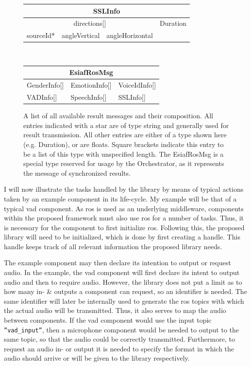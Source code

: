 \begin{figure}[]
	\begin{tabular}{| l | l | l | l|}
		\hline
		
		\multicolumn{4}{|c|}{\textbf{SSLInfo}} \\ \hline
		\multicolumn{3}{|c|}{directions[]} & Duration  \\\cline{1-3}
		sourceId* & angleVertical & angleHorizontal & \\\hline
	\end{tabular}\\\vspace{0.3cm}
	
	\begin{tabular}{| l | l | l |}
		\hline
		
		\multicolumn{3}{|c|}{\textbf{EsiafRosMsg}} \\ \hline
		GenderInfo[]	& EmotionInfo[]	& VoiceIdInfo[]	\\\hline
		VADInfo[]	& SpeechInfo[]	& SSLInfo[] \\\hline
	\end{tabular}
	\caption{A list of all available result messages and their composition.
		All entries indicated with a star are of type string and generally used for result transmission.
		All other entries are either of a type shown here (e.g. Duration), or are floats.
		Square brackets indicate this entry to be a list of this type with unspecified length.
		The EsiafRosMsg is a special type reserved for usage by the Orchestrator, as it represents the message of synchronized results.
		}
	\label{table:main:lib:messages}
\end{figure}


I will now illustrate the tasks handled by the library by means of typical actions taken by an example component in its life-cycle.
My example will be that of a typical \gls{vad} component.
As \gls{ros} is used as an underlying middleware, components within the proposed framework must also use \gls{ros} for a number of tasks.
Thus, it is necessary for the component to first initialize \gls{ros}.
Following this, the proposed library will need to be initialized, which is done by first creating a handle.
This handle keeps track of all relevant information the proposed library needs.

The example component may then declare its intention to output or request audio.
In the example, the \gls{vad} component will first declare its intent to output audio and then to require audio.
However, the library does not put a limit as to how many in- \& outputs a component can request, so an identifier is needed.
The same identifier will later be internally used to generate the \gls{ros} topics with which the actual audio will be transmitted.
Thus, it also serves to map the audio between components.
If the \gls{vad} component would use the input topic \texttt{''vad\_input''}, then a microphone component would be needed to output to the same topic, so that the audio could be correctly transmitted.
Furthermore, to request an audio in- or output it is needed to specify the format in which the audio should arrive or will be given to the library respectively.

